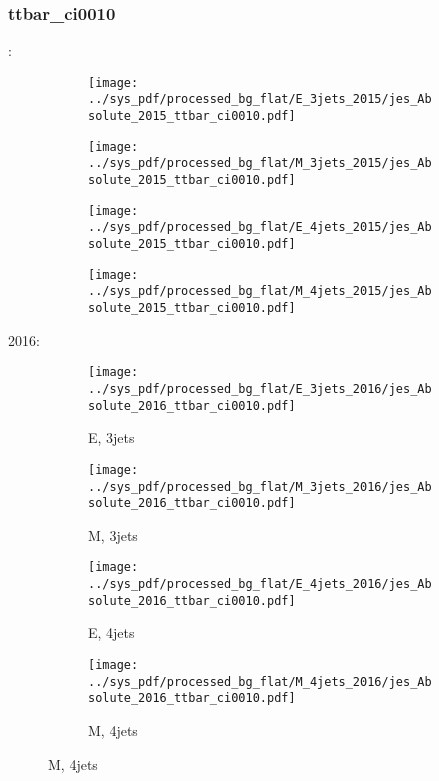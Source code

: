\documentclass{beamer}
\begin{document}
\begin{frame}
\frametitle{ttbar_ci0010}
\fontsize{5}{1}:
\begin{figure}
\centering
\begin{subfigure}[b]{0.24\textwidth}
\texttt{[image: ../sys\_pdf/processed\_bg\_flat/E\_3jets\_2015/jes\_Absolute\_2015\_ttbar\_ci0010.pdf]}
\end{subfigure}
\begin{subfigure}[b]{0.24\textwidth}
\texttt{[image: ../sys\_pdf/processed\_bg\_flat/M\_3jets\_2015/jes\_Absolute\_2015\_ttbar\_ci0010.pdf]}
\end{subfigure}
\begin{subfigure}[b]{0.24\textwidth}
\texttt{[image: ../sys\_pdf/processed\_bg\_flat/E\_4jets\_2015/jes\_Absolute\_2015\_ttbar\_ci0010.pdf]}
\end{subfigure}
\begin{subfigure}[b]{0.24\textwidth}
\texttt{[image: ../sys\_pdf/processed\_bg\_flat/M\_4jets\_2015/jes\_Absolute\_2015\_ttbar\_ci0010.pdf]}
\end{subfigure}
\end{figure}
2016:
\begin{figure}
\centering
\begin{subfigure}[b]{0.24\textwidth}
\texttt{[image: ../sys\_pdf/processed\_bg\_flat/E\_3jets\_2016/jes\_Absolute\_2016\_ttbar\_ci0010.pdf]}
\captionsetup{font=tiny}
\caption{E, 3jets}
\end{subfigure}
\begin{subfigure}[b]{0.24\textwidth}
\texttt{[image: ../sys\_pdf/processed\_bg\_flat/M\_3jets\_2016/jes\_Absolute\_2016\_ttbar\_ci0010.pdf]}
\captionsetup{font=tiny}
\caption{M, 3jets}
\end{subfigure}
\begin{subfigure}[b]{0.24\textwidth}
\texttt{[image: ../sys\_pdf/processed\_bg\_flat/E\_4jets\_2016/jes\_Absolute\_2016\_ttbar\_ci0010.pdf]}
\captionsetup{font=tiny}
\caption{E, 4jets}
\end{subfigure}
\begin{subfigure}[b]{0.24\textwidth}
\texttt{[image: ../sys\_pdf/processed\_bg\_flat/M\_4jets\_2016/jes\_Absolute\_2016\_ttbar\_ci0010.pdf]}
\captionsetup{font=tiny}
\caption{M, 4jets}
\end{subfigure}
\end{figure}
\end{frame}
\end{document}
